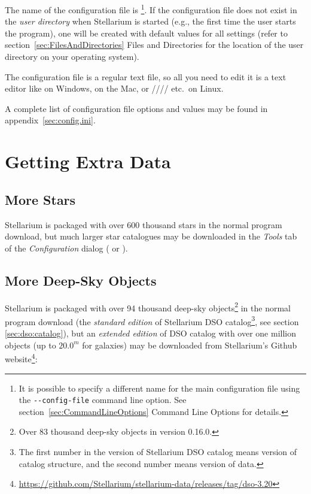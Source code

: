 The name of the configuration file is
\footnote{It is possible to specify a different name
  for the main configuration file using the \texttt{-\/-config-file}
  command line option. See section~\ref{sec:CommandLineOptions} Command 
  Line Options for details.}.
If the configuration file does not exist in the \emph{user directory}
when Stellarium is started (e.g., the first time the user starts the
program), one will be created with default values for all settings
(refer to section~\ref{sec:FilesAndDirectories} Files and
Directories for the location of the user directory on your operating
system).


The configuration file is a regular text file, so all you need to edit
it is a text editor like  on Windows,  on
the Mac, or //// etc.\ on Linux.

A complete list of configuration file options and values may be found
in appendix~\ref{sec:config.ini}.


\section{Getting Extra Data}
\label{sec:ExtraData}

\subsection{More Stars}
\label{sec:ExtraData:stars}
Stellarium is packaged with over 600 thousand stars in the normal
program download, but much larger star catalogues may be downloaded
in the \emph{Tools} tab of the \emph{Configuration} dialog ( or
).

\subsection{More Deep-Sky Objects}
\label{sec:ExtraData:DSOs}

\noindent{}Stellarium is packaged with over 94 thousand deep-sky 
objects\footnote{Over 83 thousand deep-sky objects in version 0.16.0.} in the normal
program download (the \emph{standard edition} of Stellarium DSO catalog\footnote{The first 
number in the version of Stellarium DSO catalog means version of catalog structure, 
and the second number means version of data.}, see section \ref{sec:dso:catalog}), 
but an \emph{extended edition} of DSO catalog with over one million objects (up to $20.0^m$ for galaxies) may be downloaded
from Stellarium's Github website\footnote{\url{https://github.com/Stellarium/stellarium-data/releases/tag/dso-3.20}}:

